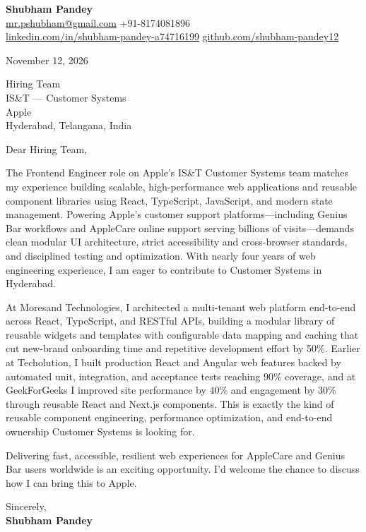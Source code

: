 \documentclass[a4paper,11pt]{article}
\begin{document}
\textbf{\Large Shubham Pandey}\\
\href{mailto:mr.pshubham@gmail.com}{mr.pshubham@gmail.com} \quad +91-8174081896\\
\href{https://www.linkedin.com/in/shubham-pandey-a74716199/}{linkedin.com/in/shubham-pandey-a74716199} \quad
\href{https://github.com/shubham-pandey12}{github.com/shubham-pandey12}

\vspace{1em}
November 12, 2026

\vspace{1em}
Hiring Team\\
IS\&T --- Customer Systems\\
Apple\\
Hyderabad, Telangana, India

\vspace{1em}
Dear Hiring Team,

The Frontend Engineer role on Apple's IS\&T Customer Systems team matches my experience building scalable, high-performance web applications and reusable component libraries using React, TypeScript, JavaScript, and modern state management. Powering Apple's customer support platforms—including Genius Bar workflows and AppleCare online support serving billions of visits—demands clean modular UI architecture, strict accessibility and cross-browser standards, and disciplined testing and optimization. With nearly four years of web engineering experience, I am eager to contribute to Customer Systems in Hyderabad.

At Moresand Technologies, I architected a multi-tenant web platform end-to-end across React, TypeScript, and RESTful APIs, building a modular library of reusable widgets and templates with configurable data mapping and caching that cut new-brand onboarding time and repetitive development effort by 50\%. Earlier at Techolution, I built production React and Angular web features backed by automated unit, integration, and acceptance tests reaching 90\% coverage, and at GeekForGeeks I improved site performance by 40\% and engagement by 30\% through reusable React and Next.js components. This is exactly the kind of reusable component engineering, performance optimization, and end-to-end ownership Customer Systems is looking for.

Delivering fast, accessible, resilient web experiences for AppleCare and Genius Bar users worldwide is an exciting opportunity. I'd welcome the chance to discuss how I can bring this to Apple.

\vspace{1em}
Sincerely,\\[0.5em]
\textbf{Shubham Pandey}
\end{document}
